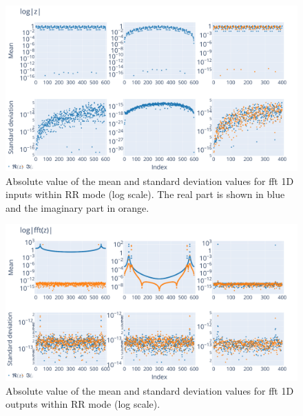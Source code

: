 \documentclass[10pt,journal,compsoc]{IEEEtran}
\begin{document}
\begin{figure}
    \centering
    \includegraphics[width=\linewidth]{figure/FFT/fft_x.pdf}
    \caption{Absolute value of the mean and standard deviation values for fft 1D
        inputs within RR mode (log scale). The real part is shown in blue and
        the imaginary part in orange.}
    \label{fig:fft1D_inputs}
\end{figure}

\begin{figure}
    \centering
    \includegraphics[width=\linewidth]{figure/FFT/fft_y.pdf}
    \caption{Absolute value of the mean and standard deviation values for fft 1D
        outputs within RR mode (log scale).}
    \label{fig:fft1D_outputs}
\end{figure}
\end{document}
